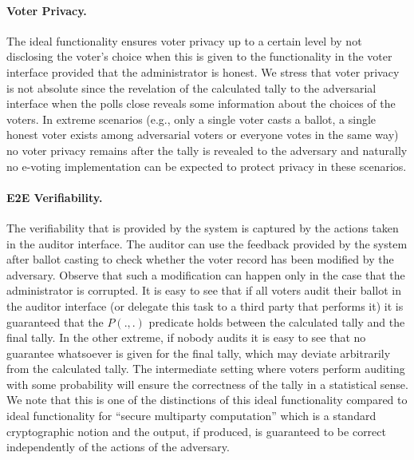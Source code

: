 \paragraph{Voter Privacy.}  The ideal functionality ensures voter
privacy up to a certain level by not disclosing the voter's choice
when this is given to the functionality in the voter interface
provided that the administrator is honest. We stress that voter
privacy is not absolute since the revelation of the calculated tally
to the adversarial interface when the polls close reveals some
information about the choices of the voters. In extreme scenarios
(e.g., only a single voter casts a ballot, a single honest voter
exists among adversarial voters or everyone votes in the same way) no
voter privacy remains after the tally is revealed to the adversary and
naturally no e-voting implementation can be expected to protect
privacy in these scenarios.

\paragraph{E2E Verifiability.} The verifiability that is provided by
the system is captured by the actions taken in the auditor
interface. The auditor can use the feedback provided by the system
after ballot casting to check whether the voter record has been
modified by the adversary. Observe that such a modification can happen
only in the case that the administrator is corrupted. It is easy to
see that if all voters audit their ballot in the auditor interface (or
delegate this task to a third party that performs it) it is guaranteed
that the $P(.,.)$ predicate holds between the calculated tally and the
final tally. In the other extreme, if nobody audits it is easy to see
that no guarantee whatsoever is given for the final tally, which may
deviate arbitrarily from the calculated tally. The intermediate
setting where voters perform auditing with some probability will
ensure the correctness of the tally in a statistical sense. We note
that this is one of the distinctions of this ideal functionality
compared to ideal functionality for ``secure multiparty computation''
which is a standard cryptographic notion and the output, if produced,
is guaranteed to be correct independently of the actions of the
adversary.

